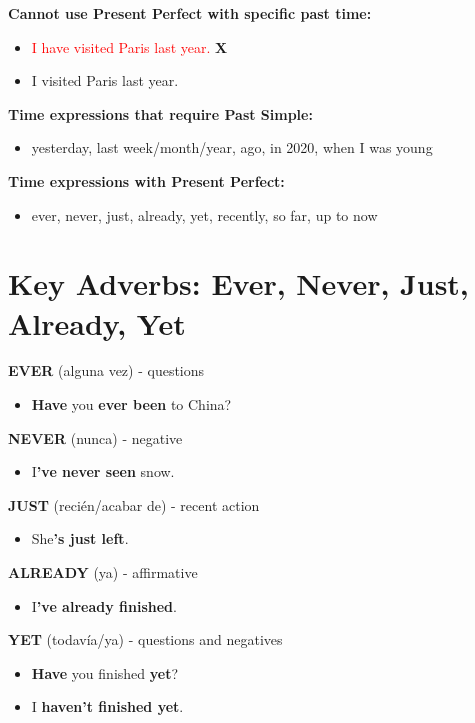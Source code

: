 \begin{examplebox}[title=When to Use Each Tense]
\textbf{Cannot use Present Perfect with specific past time:}
\begin{itemize}
    \item \textcolor{red}{I have visited Paris last year.} \textbf{X}
    \item \textcolor{green!60!black}{I visited Paris last year.} \checkmark
\end{itemize}

\textbf{Time expressions that require Past Simple:}
\begin{itemize}
    \item yesterday, last week/month/year, ago, in 2020, when I was young
\end{itemize}

\textbf{Time expressions with Present Perfect:}
\begin{itemize}
    \item ever, never, just, already, yet, recently, so far, up to now
\end{itemize}
\end{examplebox}

\section{Key Adverbs: Ever, Never, Just, Already, Yet}

\begin{vocabbox}[title=Important Adverbs with Present Perfect]
\textbf{EVER} (alguna vez) - questions
\begin{itemize}
    \item \textbf{Have} you \textbf{ever been} to China? 
\end{itemize}

\textbf{NEVER} (nunca) - negative
\begin{itemize}
    \item I\textbf{'ve never seen} snow. 
\end{itemize}

\textbf{JUST} (recién/acabar de) - recent action
\begin{itemize}
    \item She\textbf{'s just left}. 
\end{itemize}

\textbf{ALREADY} (ya) - affirmative
\begin{itemize}
    \item I\textbf{'ve already finished}. 
\end{itemize}

\textbf{YET} (todavía/ya) - questions and negatives
\begin{itemize}
    \item \textbf{Have} you finished \textbf{yet}? 
    \item I \textbf{haven't finished yet}. 
\end{itemize}
\end{vocabbox}

